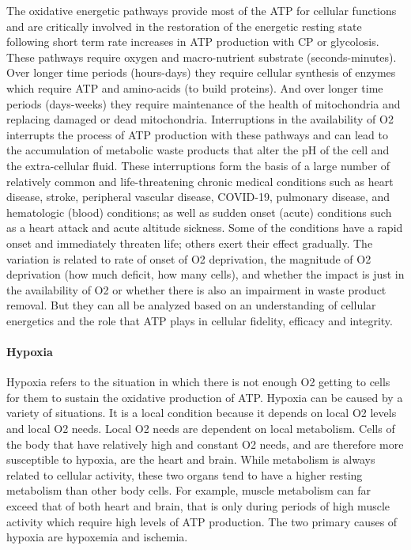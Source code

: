The oxidative energetic pathways provide most of the ATP for cellular functions and are critically involved in the restoration of the energetic resting state following short term rate increases in ATP production with CP or glycolosis. These pathways require oxygen and macro-nutrient substrate (seconds-minutes). Over longer time periods (hours-days) they require cellular synthesis of enzymes which require ATP and amino-acids (to build proteins). And over longer time periods (days-weeks) they require maintenance of the health of mitochondria and replacing damaged or dead mitochondria. Interruptions in the availability of O2 interrupts the process of ATP production with these pathways and can lead to the accumulation of metabolic waste products that alter the pH of the cell and the extra-cellular fluid. These interruptions form the basis of a large number of relatively common and life-threatening chronic medical conditions such as heart disease, stroke, peripheral vascular disease, COVID-19, pulmonary disease, and hematologic (blood) conditions; as well as sudden onset (acute) conditions such as a heart attack and acute altitude sickness. 
Some of the conditions have a rapid onset and immediately threaten life; others exert their effect gradually. The variation is related to rate of onset of O2 deprivation, the magnitude of O2 deprivation (how much deficit, how many cells), and whether the impact is just in the availability of O2 or whether there is also an impairment in waste product removal. But they can all be analyzed based on an understanding of cellular energetics and the role that ATP plays in cellular fidelity, efficacy and integrity.

\paragraph{Hypoxia}
Hypoxia refers to the situation in which there is not enough O2 getting to cells for them to sustain the oxidative production of ATP. Hypoxia can be caused by a variety of situations. It is a local condition because it depends on local O2 levels and local O2 needs. Local O2 needs are dependent on local metabolism. Cells of the body that have relatively high and constant O2 needs, and are therefore more susceptible to hypoxia, are the heart and brain. While metabolism is always related to cellular activity, these two organs tend to have a higher resting metabolism than other body cells. For example, muscle metabolism can far exceed that of both heart and brain, that is only during periods of high muscle activity which require high levels of ATP production. 
The two primary causes of hypoxia are hypoxemia and ischemia.

